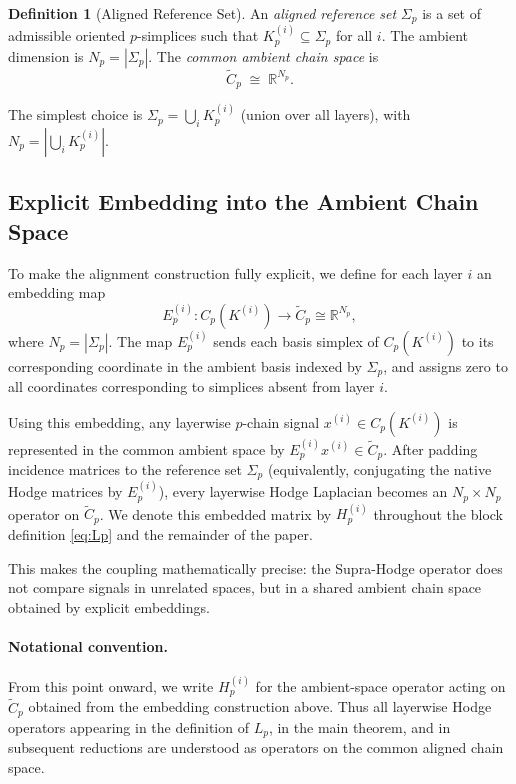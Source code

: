 \documentclass[11pt]{article}
\theoremstyle{definition}
\newtheorem{definition}[theorem]{Definition}
\theoremstyle{remark}
\newcommand{\R}{\mathbb{R}}
\newcommand{\Ctil}{\widetilde{C}}
\begin{document}
\begin{definition}[Aligned Reference Set]
An \emph{aligned reference set} $\Sigma_p$ is a set of admissible oriented
$p$-simplices such that $K_p^{(i)}\subseteq\Sigma_p$ for all $i$. The ambient
dimension is $N_p = |\Sigma_p|$. The \emph{common ambient chain space} is
\[
  \Ctil_p \;\cong\; \R^{N_p}.
\]
\end{definition}

The simplest choice is $\Sigma_p = \bigcup_i K_p^{(i)}$ (union over all
layers), with $N_p = |\bigcup_i K_p^{(i)}|$.

\subsection{Explicit Embedding into the Ambient Chain Space}

To make the alignment construction fully explicit, we define for each layer $i$ an embedding map
\[
E_p^{(i)} : C_p\!\left(K^{(i)}\right) \longrightarrow \Ctil_p \cong \R^{N_p},
\]
where $N_p = |\Sigma_p|$. The map $E_p^{(i)}$ sends each basis simplex of $C_p(K^{(i)})$
to its corresponding coordinate in the ambient basis indexed by $\Sigma_p$, and assigns zero to all coordinates corresponding to simplices absent from layer $i$.

Using this embedding, any layerwise $p$-chain signal $x^{(i)} \in C_p(K^{(i)})$ is represented in the common ambient space by $E_p^{(i)}x^{(i)} \in \Ctil_p$. After padding incidence matrices to the reference set $\Sigma_p$ (equivalently, conjugating the native Hodge matrices by $E_p^{(i)}$), every layerwise Hodge Laplacian becomes an $N_p\times N_p$ operator on $\Ctil_p$. We denote this embedded matrix by $H_p^{(i)}$ throughout the block definition \eqref{eq:Lp} and the remainder of the paper.

This makes the coupling mathematically precise: the Supra-Hodge operator does not compare signals in unrelated spaces, but in a shared ambient chain space obtained by explicit embeddings.

\paragraph{Notational convention.}
From this point onward, we write $H_p^{(i)}$ for the ambient-space operator acting on $\Ctil_p$ obtained from the embedding construction above. Thus all layerwise Hodge operators appearing in the definition of $L_p$, in the main theorem, and in subsequent reductions are understood as operators on the common aligned chain space.
\end{document}

